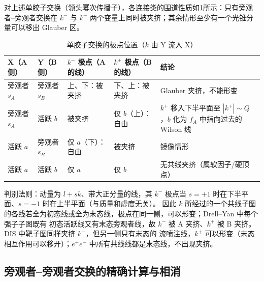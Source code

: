 \begin{proposition}\label{prop:glb-pinch}
对上述单胶子交换（领头幂次传播子），各连接类的围道性质如\cref{tab:glb-poles}所示：只有旁观者–旁观者交换在 $k^-$ 与
$k^+$ 两个变量上同时被夹挤；其余情形至少有一个光锥分量可以移出 Glauber 区。
\end{proposition}

\begin{table}[htbp]\centering
\caption{单胶子交换的极点位置（$k$ 由 Y 流入 X）}\label{tab:glb-poles}
\begin{tabular}{@{}llllp{4.6cm}@{}}\toprule
X（A 侧） & Y（B 侧） & $k^-$ 极点（A 的线） & $k^+$ 极点（B 的线） & 结论\\\midrule
旁观者 $s_A$ & 旁观者 $s_B$ & 上、下：被夹挤 & 下、上：被夹挤 & Glauber 夹挤，不能形变\\
旁观者 $s_A$ & 活跃 $b$ & 被夹挤 & 仅 $b$（上）：自由 & $k^+$ 移入下半平面至 $|k^+|\sim Q$，$b$ 化为 $f_A$ 中指向过去的 Wilson 线\\
活跃 $a$ & 旁观者 $s_B$ & 仅 $a$（下）：自由 & 被夹挤 & 镜像情形\\
活跃 $a$ & 活跃 $b$ & 仅 $a$ & 仅 $b$ & 无共线夹挤（属软因子/硬顶点）\\\bottomrule
\end{tabular}
\end{table}

判别法则：动量为 $l+sk$、带大正分量的线，其 $k^-$ 极点当 $s=+1$ 时在下半平面、$s=-1$ 时在上半平面（与质量和虚度无关）。
因此 $k$ 所经过的一个共线子图的各线若全为初态线或全为末态线，极点在同一侧，可以形变；Drell--Yan 中每个强子子图既有
初态活跃线又有末态旁观者线，故 $k^-$ 被 A 夹挤、$k^+$ 被 B 夹挤。DIS 中靶子图同样夹挤 $k^-$，但另一侧只有末态的
流喷注线，$k^+$ 可以形变（末态相互作用可以移开）；$e^+e^-$ 中所有共线线都是末态线，不出现夹挤。%

\subsection{旁观者–旁观者交换的精确计算与相消}

